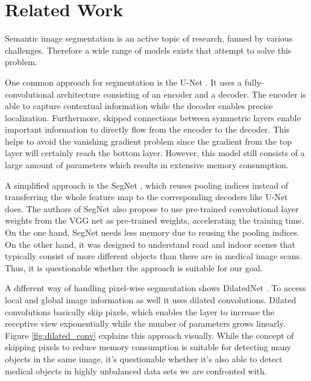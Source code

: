 \documentclass[a4paper,12pt,pagesize,headsepline,bibtotoc,titlepage]{scrartcl}
\begin{document}
\section{Related Work}
\label{sec:related}
Semantic image segmentation is an active topic of research, fanned by various challenges.
Therefore a wide range of models exists that attempt to solve this problem.

One common approach for segmentation is the U-Net \cite{DBLP:journals/corr/RonnebergerFB15}.
It uses a fully-convolutional architecture consisting of an encoder and a decoder.
The encoder is able to capture contextual information while the decoder enables precise localization.
Furthermore, skipped connections between symmetric layers enable important information to directly flow from the encoder to the decoder.
This helps to avoid the vanishing gradient problem since the gradient from the top layer will certainly reach the bottom layer.
However, this model still consists of a large amount of parameters which results in extensive memory consumption.

A simplified approach is the SegNet \cite{segnet2}, which reuses pooling indices instead of transferring the whole feature map to the corresponding decoders like U-Net does.
The authors of SegNet also propose to use pre-trained convolutional layer weights from the VGG net as pre-trained weights, accelerating the training time.
On the one hand, SegNet needs less memory due to reusing the pooling indices.
On the other hand, it was designed to understand road and indoor scenes that typically consist of more different objects than there are in medical image scans.
Thus, it is questionable whether the approach is suitable for our goal.

A different way of handling pixel-wise segmentation shows DilatedNet \cite{DilatedNet2015}.
To access local and global image information as well it uses dilated convolutions.
Dilated convolutions basically skip pixels, which enables the layer to increase the receptive view exponentially while the number of parameters grows linearly.
Figure \ref{fig:dilated_conv} explains this approach visually.
While the concept of skipping pixels to reduce memory consumption is suitable for detecting many objects in the same image, it's questionable whether it's also able to detect medical objects in highly unbalanced data sets we are confronted with.
\end{document}
